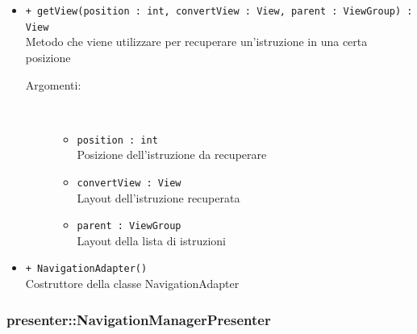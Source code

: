 \documentclass[../DefinizioneDiProdotto.tex]{subfiles}
\begin{document}
\begin{description}
\begin{itemize}
\item \texttt{+ getView(position : int, convertView : View, parent : ViewGroup) : View}\\
Metodo che viene utilizzare per recuperare un'istruzione in una certa posizione
 \begin{description}
\item[Argomenti:] \
\begin{itemize}
\item \texttt{position : int}\\
Posizione dell'istruzione da recuperare\item \texttt{convertView : View}\\
Layout dell'istruzione recuperata\item \texttt{parent : ViewGroup}\\
Layout della lista di istruzioni\end{itemize}
\end{description}
\item \texttt{+ NavigationAdapter()}\\
Costruttore della classe NavigationAdapter
 \end{itemize}
\end{description}

\subsubsection{presenter::NavigationManagerPresenter}
\end{document}

